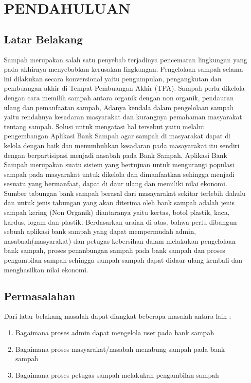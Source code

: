 \chapter{PENDAHULUAN}
\section{Latar Belakang}
\label{sec:latarbelakang} %

Sampah merupakan salah satu penyebab terjadinya pencemaran lingkungan yang pada akhirnya menyebabkan kerusakan lingkungan. Pengelolaan sampah selama ini dilakukan secara konversional yaitu pengumpulan, pengangkutan dan pembuangan akhir di Tempat Pembuangan Akhir (TPA). Sampah perlu dikelola dengan cara memilih sampah antara organik dengan non organik, pendauran ulang dan pemanfaatan sampah, Adanya kendala dalam pengelolaan sampah yaitu rendahnya kesadaran masyarakat dan kurangnya pemahaman masyarakat tentang sampah. Solusi untuk mengatasi hal tersebut yaitu melalui pengembangan Aplikasi Bank Sampah agar sampah di masyarakat dapat di kelola dengan baik dan menumbuhkan kesadaran pada masayarakat itu sendiri dengan berpartisipasi menjadi nasabah pada Bank Sampah.     
Aplikasi Bank Sampah merupakan suatu sistem yang bertujuan untuk mengurangi populasi sampah pada masyarakat untuk dikelola dan dimanfaatkan sehingga menjadi sesuatu yang bermanfaat, dapat di daur ulang dan memiliki nilai ekonomi. Sumber tabungan bank sampah berasal dari masayarakat sekitar terlebih dahulu dan untuk jenis tabungan yang akan diterima oleh bank sampah adalah jenis sampah kering (Non Organik) diantaranya yaitu kertas, botol plastik, kaca, kardus, logam dan plastik. 
Berdasarkan uraian di atas, bahwa perlu dibangun sebuah aplikasi bank sampah yang dapat mempermudah admin, nasabaah(masyarakat) dan petugas kebersihan dalam melakukan pengelolaan bank sampah, proses penanbungan sampah pada bank sampah dan proses pengambilan sampah sehingga sampah-sampah dapat didaur ulang kembali dan menghasilkan nilai ekonomi.


\section{Permasalahan}
Dari latar belakang masalah dapat diangkat beberapa masalah antara lain :
\begin{enumerate}
\item Bagaimana proses admin dapat mengelola user pada bank sampah
\item Bagaimana proses masyarakat/nasabah menabung sampah pada bank sampah 
\item Bagaimana proses petugas sampah melakukan pengambilan sampah 
\end{enumerate}


